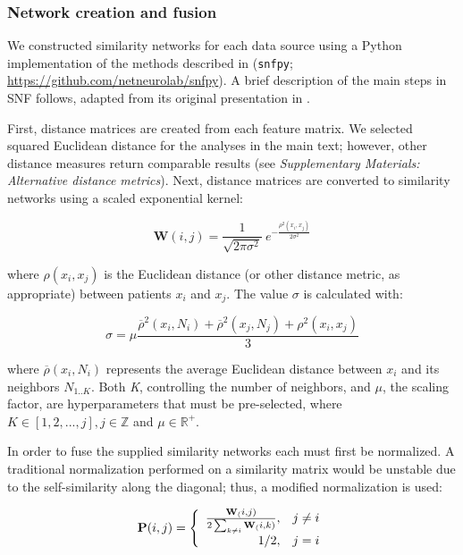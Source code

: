 \documentclass[12pt,aps,pra,reprint,showkeys]{revtex4-1}
\begin{document}
\subsubsection*{Network creation and fusion}

We constructed similarity networks for each data source using a Python implementation of the methods described in \citep{wang2014similarity} (\texttt{snfpy}; \url{https://github.com/netneurolab/snfpy}).
A brief description of the main steps in SNF follows, adapted from its original presentation in \citep{wang2014similarity}.

First, distance matrices are created from each feature matrix.
We selected squared Euclidean distance for the analyses in the main text; however, other distance measures return comparable results (see \textit{Supplementary Materials: Alternative distance metrics}).
Next, distance matrices are converted to similarity networks using a scaled exponential kernel:

\begin{equation*}
   \mathbf{W}(i, j) = \frac{1}{\sqrt{2\pi\sigma^2}} \ e^{-\frac{\rho^2(x_{i},x_{j})}{2\sigma^2}}
\end{equation*}

\noindent where $\rho(x_{i},x_{j})$ is the Euclidean distance (or other distance metric, as appropriate) between patients $x_{i}$ and $x_{j}$.
The value $\sigma$ is calculated with:

\begin{equation*}
   \sigma = \mu \frac{\overline{\rho}^2(x_{i},N_{i}) + \overline{\rho}^2(x_{j},N_{j}) + \rho^2(x_{i},x_{j})}
                     {3}
\end{equation*}

\noindent where $\overline{\rho}(x_{i},N_{i})$ represents the average Euclidean distance between $x_{i}$ and its neighbors $N_{1..K}$.
Both \emph{K}, controlling the number of neighbors, and $\mu$, the scaling factor, are hyperparameters that must be pre-selected, where $K \in [1, 2, ..., j], j \in \mathbb{Z} $ and $\mu \in \mathbb{R}^{+}$.

In order to fuse the supplied similarity networks each must first be normalized.
A traditional normalization performed on a similarity matrix would be unstable due to the self-similarity along the diagonal; thus, a modified normalization is used:

\begin{equation*}
    \mathbf{P}(i,j) =
     \left\{\begin{array}{r r}
       \frac{\mathbf{W}_(i,j)}
            {2 \sum_{k\neq i}^{} \mathbf{W}_(i,k)} ,& j \neq i \\
                                               1/2 ,& j = i
     \end{array}\right.
\end{equation*}
\end{document}
